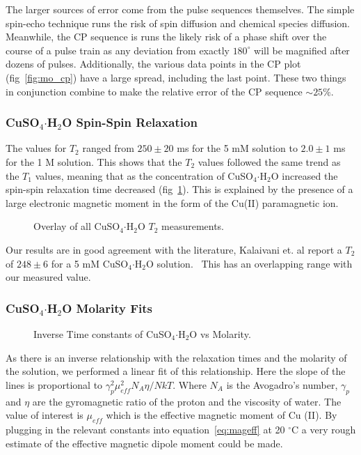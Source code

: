 \documentclass[
reprint,
amsmath,amssymb,
aps,
tikz,
border=5pt
]{revtex4-1}
\newcommand*{\cuso}[1][]{CuSO$_{4} \boldsymbol{\cdot} $H$_2$O }
\newcommand*{\tc}[1][1]{$T_#1$ }
\newcommand*{\tg}[1][2]{$T_#1$ }
\begin{document}
      The larger sources of error come from the pulse sequences themselves. The simple spin-echo technique runs the risk of spin diffusion and chemical species diffusion. Meanwhile, the CP sequence is runs the likely risk of a phase shift over the course of a pulse train as any deviation from exactly $180^\circ$ will be magnified after dozens of pulses. Additionally, the various data points in the CP plot (fig~\ref{fig:mo_cp}) have a large spread, including the last point. These two things in conjunction combine to make the relative error of the CP sequence $\sim 25\%$. 

\subsubsection*{\cuso Spin-Spin Relaxation}

      The values for \tc[2] ranged from $250 \pm 20$ ms for the 5 mM solution to $2.0 \pm 1$ ms for the 1 M solution. This shows that the \tg values followed the same trend as the \tc values, meaning that as the concentration of \cuso increased the spin-spin relaxation time decreased (fig~\ref{fig:sumt2}). This is explained by the presence of a large electronic magnetic moment in the form of the Cu(II) paramagnetic ion.  

      \begin{figure}[b]
        \resizebox{0.45\textwidth}{!}{}
        \caption{Overlay of all \cuso \tg measurements. }
        \label{fig:sumt2}
     \end{figure}

      Our results are in good agreement with the literature, Kalaivani et. al report a \tg of $248 \pm 6$ for a 5 mM \cuso solution.~\cite{THANGAVEL2017} This has an overlapping range with our measured value. 

\subsubsection*{\cuso Molarity Fits}

    \begin{figure}[h]
        \resizebox{0.45\textwidth}{!}{}
        \caption{Inverse Time constants of CuSO$_{4} \boldsymbol{\cdot} $H$_2$O vs Molarity. }
        \label{fig:cu_linear}
    \end{figure}

     As there is an inverse relationship with the relaxation times and the molarity of the solution, we performed a linear fit of this relationship. Here the slope of the lines is proportional to $\gamma^2_p \mu^2_{eff} N_{A} \eta / NkT$. Where $N_{A}$ is the Avogadro's number, $\gamma_p$ and $\eta$ are the gyromagnetic ratio of the proton and the viscosity of water. The value of interest is $\mu_{eff}$ which is the effective magnetic moment of Cu (II). By plugging in the relevant constants into equation~\ref{eq:mageff} at 20 $^\circ$C a very rough estimate of the effective magnetic dipole moment could be made. 
\end{document}
